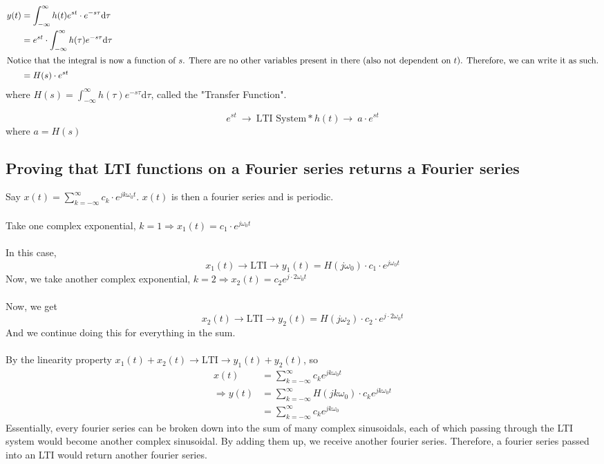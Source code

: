 \documentclass[10pt]{article}
\begin{document}
\begin{align*}
    y(t) &= \int_{-\infty}^\infty h(t) e^{st} \cdot e^{-s\tau} \text{d}\tau\\
    &= e^{st} \cdot \int_{-\infty}^\infty h(\tau) e^{-s\tau} \text{d}\tau\\
    \intertext{Notice that the integral is now a function of $s$.  There are no other variables present in there (also not dependent on $t$).  Therefore, we can write it as such.}
    &= H(s) \cdot e^{st}
\end{align*}
where $H(s) = \int_{-\infty}^\infty h(\tau) e^{-s\tau} \text{d}\tau$, called the "Transfer Function".

\[e^{st} \:\longrightarrow\:\boxed{\text{LTI System} * h(t)} \longrightarrow \: a\cdot e^{st}\]
where $a = H(s)$

\subsection*{Proving that LTI functions on a Fourier series returns a Fourier series}
Say $x(t) = \sum_{k = -\infty}^\infty c_k \cdot e^{jk\omega_0 t}$.  $x(t)$ is then a fourier series and is periodic.\\\\
Take one complex exponential, $k = 1 \Rightarrow x_1(t) = c_1 \cdot e^{j\omega_0 t}$\\\\
In this case,
\[x_1(t) \longrightarrow \boxed{\text{LTI}}\longrightarrow y_1(t) = H(j\omega_0) \cdot c_1 \cdot e^{j \omega_0 t}\]
Now, we take another complex exponential, $k = 2 \Rightarrow x_2(t) = c_2 e^{j \cdot 2\omega_0 t}$\\\\
Now, we get
\[x_2(t) \longrightarrow\boxed{\text{LTI}}\longrightarrow y_2(t) = H(j\omega_2) \cdot c_2 \cdot e^{j \cdot 2\omega_0 t}\]
And we continue doing this for everything in the sum.\\\\
By the linearity property $x_1(t) + x_2(t) \rightarrow\boxed{\text{LTI}}\rightarrow y_1(t) + y_2(t)$, so
\begin{align*}
    x(t) &= \sum_{k = -\infty}^\infty c_k e^{jk\omega_0 t}\\
    \Rightarrow y(t) &= \sum_{k = -\infty}^\infty H(jk\omega_0) \cdot c_k e^{jk\omega_0 t}\\
    &= \sum_{k = -\infty}^\infty c_k e^{jk\omega_0}
\end{align*}
Essentially, every fourier series can be broken down into the sum of many complex sinusoidals, each of which passing through the LTI system would become another complex sinusoidal.  By adding them up, we receive another fourier series.  Therefore, a fourier series passed into an LTI would return another fourier series.
\end{document}
